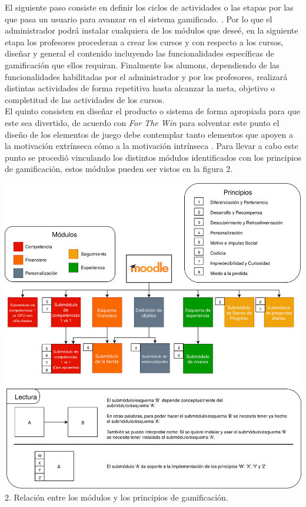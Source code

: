     \noindent
    El siguiente paso consiste en definir los ciclos de actividades o las etapas
    por las que pasa un usuario para avanzar en el sistema gamificado.
    \cite{ForTheWin}. Por lo que el administrador podrá instalar cualquiera
    de los módulos que deseé, en la siguiente etapa los profesores procederan a crear
    los cursos y con respecto a los cursos, diseñar y general el contenido incluyendo
    las funcionalidades específicas de gamificación que ellos requiran. Finalmente
    los alumons, dependiendo de las funcionalidades habilitadas por el administrador
    y por los profesores, realizará distintas actividades de forma repetitiva hasta
    alcanzar la meta, objetivo o completitud de las actividades de los cursos.\\

    \noindent
    El quinto consisten en diseñar el producto o sistema de forma apropiada para
    que este sea divertido, de acuerdo con {\it For The Win} para solventar este
    punto el diseño de los elementos de juego debe contemplar tanto elementos que
    apoyen a la motivación extrínseca cómo a la motivación intrínseca \cite%
    {ForTheWin}. Para llevar a cabo este punto se procedió vinculando los distintos
    módulos identificados con los principios de gamificación, estos módulos pueden
    ser vistos en la figura 2.

        \begin{center}
        \includegraphics[width=1\linewidth]{images/modulosOctalysis}
        \small 2. Relación entre los módulos y los principios de gamificación.
        \end{center}

